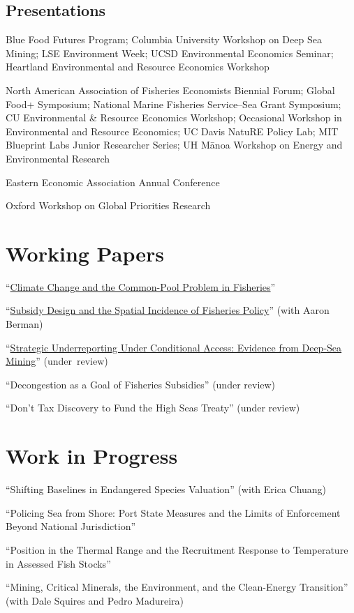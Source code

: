 \documentclass[10pt,letterpaper]{article}
\renewenvironment{itemize}{
  \begin{list}{}{
    \setlength{\leftmargin}{1.5em}
    \setlength{\topsep}{3pt}
    \setlength{\itemsep}{3pt}
    \setlength{\parsep}{0pt}
  }
}{
  \end{list}
}
\begin{document}
\subsection*{Presentations}
\begin{itemize}
  \setlength{\itemindent}{.35in}
  \item[2026] Blue Food Futures Program; Columbia University Workshop on Deep Sea Mining; LSE Environment Week; UCSD Environmental Economics Seminar; Heartland Environmental and Resource Economics Workshop
  \item[2025] North American Association of Fisheries Economists Biennial Forum; Global Food+ Symposium; National Marine Fisheries Service--Sea Grant Symposium; CU Environmental \& Resource Economics Workshop; Occasional Workshop in Environmental and Resource Economics; UC Davis NatuRE Policy Lab; MIT Blueprint Labs Junior Researcher Series; UH M\=anoa Workshop on Energy and Environmental Research
  \item[2024] Eastern Economic Association Annual Conference
  \item[2022] Oxford Workshop on Global Priorities Research
\end{itemize}

\section*{Working Papers}
\begin{itemize}
  \item ``\href{https://www.andresdeloera.com/papers/deLoera_JMP_fisheries.pdf}{Climate Change and the Common-Pool Problem in Fisheries}''
  \item ``\href{https://www.andresdeloera.com/papers/Berman_deLoera_fishsubsidies.pdf}{Subsidy Design and the Spatial Incidence of Fisheries Policy}'' (with Aaron Berman)
  \item ``\href{https://www.andresdeloera.com/papers/deLoera_DSM_exploration.pdf}{Strategic Underreporting Under Conditional Access: Evidence from Deep-Sea Mining}'' \mbox{(under review)}
  \item ``Decongestion as a Goal of Fisheries Subsidies'' (under review)
  \item ``Don't Tax Discovery to Fund the High Seas Treaty'' (under review)
\end{itemize}

\section*{Work in Progress}
\begin{itemize}
  \item ``Shifting Baselines in Endangered Species Valuation'' (with Erica Chuang)
  \item ``Policing Sea from Shore: Port State Measures and the Limits of Enforcement Beyond National Jurisdiction''
  \item ``Position in the Thermal Range and the Recruitment Response to Temperature in Assessed Fish Stocks''
  \item ``Mining, Critical Minerals, the Environment, and the Clean-Energy Transition'' (with Dale Squires and Pedro Madureira)
\end{itemize}
\end{document}
